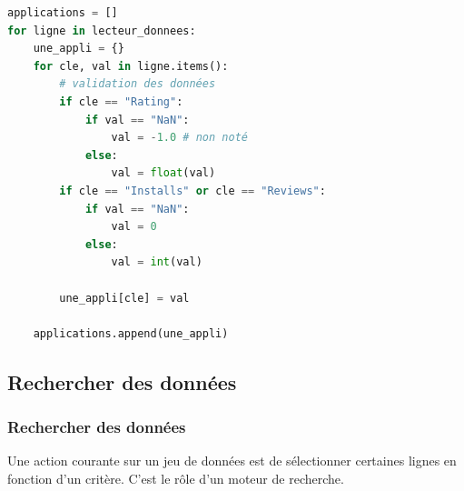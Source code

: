 \documentclass[svgnames,11pt]{beamer}
\begin{document}
\begin{frame}[fragile]
    \begin{center}
\begin{lstlisting}[language=Python, basicstyle=\ttfamily\small, xleftmargin=1em, xrightmargin=1em]
applications = []
for ligne in lecteur_donnees:
    une_appli = {}
    for cle, val in ligne.items():
        # validation des données
        if cle == "Rating":
            if val == "NaN":
                val = -1.0 # non noté
            else:
                val = float(val)
        if cle == "Installs" or cle == "Reviews":
            if val == "NaN":
                val = 0
            else:
                val = int(val)

        une_appli[cle] = val

    applications.append(une_appli)
\end{lstlisting}
    \end{center}
\end{frame}
\subsection{Rechercher des données}
\begin{frame}
    \frametitle{Rechercher des données}

    Une action courante sur un jeu de données est de sélectionner certaines lignes en fonction d'un critère. C'est le rôle d'un moteur de recherche.

\end{frame}
\end{document}
